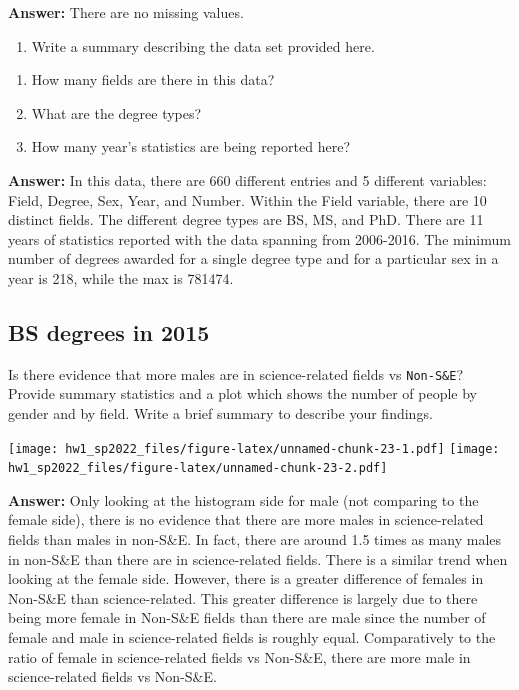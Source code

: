 \documentclass[
]{article}
\providecommand{\tightlist}{%
  \setlength{\itemsep}{0pt}\setlength{\parskip}{0pt}}
\begin{document}
\textbf{Answer:} There are no missing values.

\begin{enumerate}
\def\labelenumi{\arabic{enumi}.}
\setcounter{enumi}{1}
\tightlist
\item
  Write a summary describing the data set provided here.
\end{enumerate}

\begin{enumerate}
\def\labelenumi{\roman{enumi}.}
\tightlist
\item
  How many fields are there in this data?
\item
  What are the degree types?
\item
  How many year's statistics are being reported here?
\end{enumerate}

\textbf{Answer:} In this data, there are 660 different entries and 5
different variables: Field, Degree, Sex, Year, and Number. Within the
Field variable, there are 10 distinct fields. The different degree types
are BS, MS, and PhD. There are 11 years of statistics reported with the
data spanning from 2006-2016. The minimum number of degrees awarded for
a single degree type and for a particular sex in a year is 218, while
the max is 781474.

\hypertarget{bs-degrees-in-2015}{%
\subsection{BS degrees in 2015}\label{bs-degrees-in-2015}}

Is there evidence that more males are in science-related fields vs
\texttt{Non-S\&E}? Provide summary statistics and a plot which shows the
number of people by gender and by field. Write a brief summary to
describe your findings.

\texttt{[image: hw1\_sp2022\_files/figure-latex/unnamed-chunk-23-1.pdf]}
\texttt{[image: hw1\_sp2022\_files/figure-latex/unnamed-chunk-23-2.pdf]}

\textbf{Answer:} Only looking at the histogram side for male (not
comparing to the female side), there is no evidence that there are more
males in science-related fields than males in non-S\&E. In fact, there
are around 1.5 times as many males in non-S\&E than there are in
science-related fields. There is a similar trend when looking at the
female side. However, there is a greater difference of females in
Non-S\&E than science-related. This greater difference is largely due to
there being more female in Non-S\&E fields than there are male since the
number of female and male in science-related fields is roughly equal.
Comparatively to the ratio of female in science-related fields vs
Non-S\&E, there are more male in science-related fields vs Non-S\&E.
\end{document}

